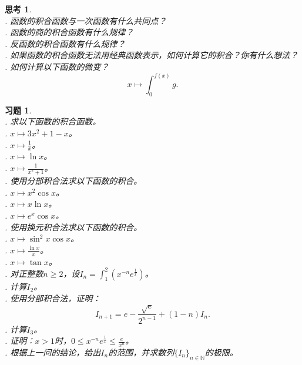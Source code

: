 \documentclass[12pt,UTF8]{ctexbook}
\theoremstyle{definition}
\theoremstyle{plain}
\newtheorem{sk}{思考}[section]
\newtheorem{xt}{习题}[section]
\begin{document}
\begin{sk}
    \mbox{} \\
    . 函数的积合函数与一次函数有什么共同点？ \\
    . 函数的商的积合函数有什么规律？\\
    . 反函数的积合函数有什么规律？\\
    . 如果函数的积合函数无法用经典函数表示，如何计算它的积合？你有什么想法？\\
    . 如何计算以下函数的微变？
    $$x\mapsto \int_0^{f(x)} g.$$
\end{sk}

\begin{xt}
    \mbox{} \\
    . 求以下函数的积合函数。\\
    . $x\mapsto 3x^2 + 1 - x$。\\
    . $x\mapsto \frac{1}{x}$。\\
    . $x\mapsto \ln{x}$。\\
    . $x\mapsto \frac{1}{x^2 + 1}$。\\
    . 使用分部积合法求以下函数的积合。\\
    . $x\mapsto x^2 \cos{x}$。 \\
    . $x\mapsto x \ln{x} $。 \\
    . $x\mapsto e^x \cos{x} $。 \\
    . 使用换元积合法求以下函数的积合。\\
    . $x\mapsto \sin^2{x} \cos{x}$。 \\
    . $x\mapsto \frac{\ln{x}}{x} $。 \\
    . $x\mapsto \tan{x} $。 \\
    . 对正整数$n\geqslant 2$，设$I_n = \int_1^2 \left(x^{-n}e^{\frac{1}{x}}\right)$。\\
    . 计算$I_2$。\\
    . 使用分部积合法，证明：
            $$ I_{n+1} = e - \frac{\sqrt{e}}{2^{n-1}} + (1 - n)I_n.$$
    . 计算$I_3$。\\
    . 证明：$x>1$时，$0\leqslant x^{-n}e^{\frac{1}{x}} \leqslant \frac{e}{x^n}$。\\
    . 根据上一问的结论，给出$I_n$的范围，并求数列$\{I_n\}_{n\in\mathbb{N}}$的极限。
\end{xt}
\end{document}
